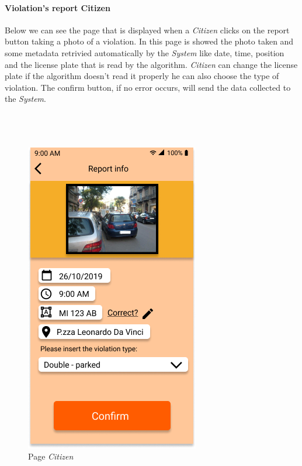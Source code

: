 \documentclass{article}
\begin{document}
\paragraph{Violation's report Citizen}
Below we can see the page that is displayed when a \textit{Citizen} clicks on the report button taking a photo of a
violation. In this page is showed the photo taken and some metadata retrivied automatically by the \textit{System} like
date, time, position and the license plate that is read by the algorithm. \textit{Citizen} can change the license plate
if the algorithm doesn't read it properly he can also choose the type of violation. The confirm button, if no error
occurs, will send the data collected to the \textit{System}.
\\
\\
\\
\\
\begin{figure}[H]
    \centering
    \includegraphics[scale=0.5]{img/mockups/page_citizen.png}
    \caption{Page \textit{Citizen}}
\end{figure}

\clearpage
\end{document}
